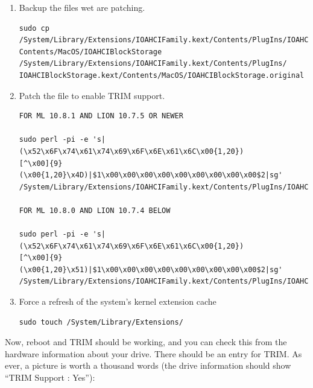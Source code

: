 \documentclass[11pt]{article}
\begin{document}
\begin{enumerate}
\item Backup the files wet are patching.
{\scriptsize
\begin{verbatim}
sudo cp /System/Library/Extensions/IOAHCIFamily.kext/Contents/PlugIns/IOAHCIBlockStorage.kext/
Contents/MacOS/IOAHCIBlockStorage /System/Library/Extensions/IOAHCIFamily.kext/Contents/PlugIns/
IOAHCIBlockStorage.kext/Contents/MacOS/IOAHCIBlockStorage.original
\end{verbatim}
}

\item Patch the file to enable TRIM support.
{\scriptsize
\begin{verbatim}
FOR ML 10.8.1 AND LION 10.7.5 OR NEWER

sudo perl -pi -e 's|(\x52\x6F\x74\x61\x74\x69\x6F\x6E\x61\x6C\x00{1,20})
[^\x00]{9}(\x00{1,20}\x4D)|$1\x00\x00\x00\x00\x00\x00\x00\x00\x00$2|sg' 
/System/Library/Extensions/IOAHCIFamily.kext/Contents/PlugIns/IOAHCIBlockStorage.kext/Contents/MacOS/IOAHCIBlockStorage

FOR ML 10.8.0 AND LION 10.7.4 BELOW

sudo perl -pi -e 's|(\x52\x6F\x74\x61\x74\x69\x6F\x6E\x61\x6C\x00{1,20})
[^\x00]{9}(\x00{1,20}\x51)|$1\x00\x00\x00\x00\x00\x00\x00\x00\x00$2|sg' 
/System/Library/Extensions/IOAHCIFamily.kext/Contents/PlugIns/IOAHCIBlockStorage.kext/Contents/MacOS/IOAHCIBlockStorage
\end{verbatim}
}

\item Force a refresh of the system's kernel extension cache
\begin{verbatim}
sudo touch /System/Library/Extensions/
\end{verbatim}

\end{enumerate}
Now, reboot and TRIM should be working, and you can check this from the hardware information about your drive.  There should be an entry for TRIM.   As ever, a picture is worth a thousand words (the drive information should show ``TRIM Support : Yes''):
\end{document}

